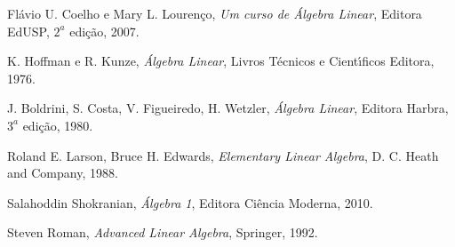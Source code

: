 \cleardoublepage
{}
{}
\renewcommand{\bibname}{Bibliografia}

\begin{thebibliography}{99}
Fl\'avio U. Coelho e Mary L. Louren\c{c}o, \textit{Um curso de \'Algebra Linear}, Editora EdUSP, $2^a$ edi\c{c}\~ao, 2007. 

K. Hoffman e R. Kunze, \textit{\'Algebra Linear}, Livros T\'ecnicos e Cient{\'\i}ficos Editora, 1976.

J. Boldrini, S. Costa, V. Figueiredo, H. Wetzler, \textit{\'Algebra Linear}, Editora Harbra, $3^a$ edi\c{c}\~ao, 1980.

Roland E. Larson, Bruce H. Edwards, \textit{Elementary Linear Algebra}, D. C. Heath and Company, 1988.

Salahoddin Shokranian, \textit{\'Algebra 1}, Editora Ci\^encia Moderna, 2010.

Steven Roman, \textit{Advanced Linear Algebra}, Springer, 1992.
\end{thebibliography}